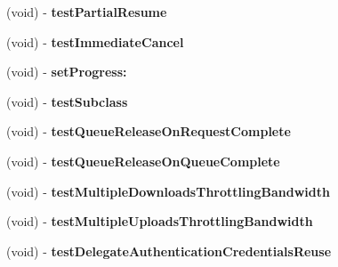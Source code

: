 \begin{DoxyCompactItemize}
\item 
\hypertarget{interface_a_s_i_network_queue_tests_a3504066fbf5ecc526035321cf0a0d74a}{
(void) -\/ {\bfseries test\-Partial\-Resume}}
\label{interface_a_s_i_network_queue_tests_a3504066fbf5ecc526035321cf0a0d74a}

\item 
\hypertarget{interface_a_s_i_network_queue_tests_a5621d435f7e0be616841da617af3ae7b}{
(void) -\/ {\bfseries test\-Immediate\-Cancel}}
\label{interface_a_s_i_network_queue_tests_a5621d435f7e0be616841da617af3ae7b}

\item 
\hypertarget{interface_a_s_i_network_queue_tests_aaa3ee5989847c5200d079241b5527795}{
(void) -\/ {\bfseries set\-Progress\-:}}
\label{interface_a_s_i_network_queue_tests_aaa3ee5989847c5200d079241b5527795}

\item 
\hypertarget{interface_a_s_i_network_queue_tests_a6c75d4f9034d8f96da30002fa7c39f6a}{
(void) -\/ {\bfseries test\-Subclass}}
\label{interface_a_s_i_network_queue_tests_a6c75d4f9034d8f96da30002fa7c39f6a}

\item 
\hypertarget{interface_a_s_i_network_queue_tests_a6ebc6405b8f6639be717def3dcbcd617}{
(void) -\/ {\bfseries test\-Queue\-Release\-On\-Request\-Complete}}
\label{interface_a_s_i_network_queue_tests_a6ebc6405b8f6639be717def3dcbcd617}

\item 
\hypertarget{interface_a_s_i_network_queue_tests_a8367da7729b914e691602cbfbb0cd4d6}{
(void) -\/ {\bfseries test\-Queue\-Release\-On\-Queue\-Complete}}
\label{interface_a_s_i_network_queue_tests_a8367da7729b914e691602cbfbb0cd4d6}

\item 
\hypertarget{interface_a_s_i_network_queue_tests_afecabb41732addf7e0b63960536af284}{
(void) -\/ {\bfseries test\-Multiple\-Downloads\-Throttling\-Bandwidth}}
\label{interface_a_s_i_network_queue_tests_afecabb41732addf7e0b63960536af284}

\item 
\hypertarget{interface_a_s_i_network_queue_tests_a3c936cbdc4d5d95c086acccc6b61a277}{
(void) -\/ {\bfseries test\-Multiple\-Uploads\-Throttling\-Bandwidth}}
\label{interface_a_s_i_network_queue_tests_a3c936cbdc4d5d95c086acccc6b61a277}

\item 
\hypertarget{interface_a_s_i_network_queue_tests_ad451f41961e411ca4e0a493564f3782e}{
(void) -\/ {\bfseries test\-Delegate\-Authentication\-Credentials\-Reuse}}
\label{interface_a_s_i_network_queue_tests_ad451f41961e411ca4e0a493564f3782e}


\end{DoxyCompactItemize}
